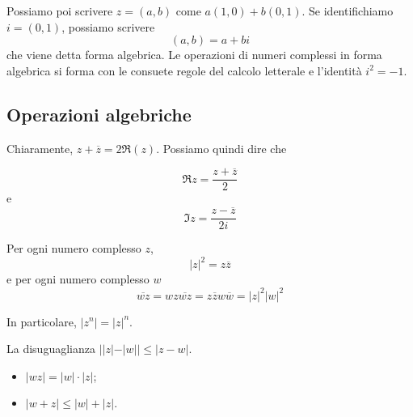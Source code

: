 \documentclass[a4paper]{article}
\begin{document}
Possiamo poi scrivere \(z=(a,b)\) come \(a(1,0) + b(0,1)\).
Se identifichiamo \(i=(0,1)\), possiamo scrivere
\[
    (a,b) = a+bi
\]
che viene detta forma algebrica.
Le operazioni di numeri complessi in forma algebrica si forma con le consuete regole del calcolo letterale
e l'identità \(i^2 = -1\).

\subsection{Operazioni algebriche}


Chiaramente, \(z + \overline{z} = 2\Re(z)\). Possiamo quindi dire che

\[
    \Re z = \frac{z + \overline{z}}{2}
\]
e
\[
    \Im z = \frac{z-\overline{z}}{2i}
\]


Per ogni numero complesso \(z\),
\[
    {|z|}^2 = z\overline{z}
\]
e per ogni numero complesso \(w\)
\[
    \overline{wz} = wz\overline{wz} = z\overline{z}w\overline{w} = |z|^2|w|^2
\]

In particolare, \(|z^n| = |z|^n\).

La disuguaglianza \(||z| - |w|| \leq |z-w|\).

\begin{itemize}
    \item \(|wz| = |w|\cdot|z|\);
    \item \(|w+z| \leq |w| + |z|\).
\end{itemize}

\end{document}
